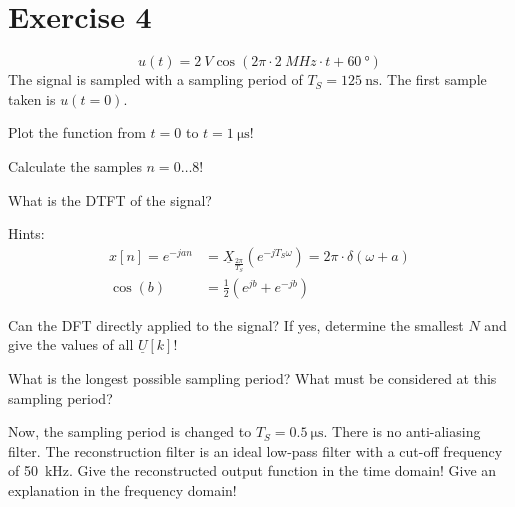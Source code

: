 %
%
%

{}
\section*{Exercise 4}

\begin{question}[subtitle={Sampling Periodic Signals}]
	\begin{equation*}
		u(t) = \SI{2}{V} \cos\left(2\pi \cdot \SI{2}{MHz} \cdot t + \SI{60}{\degree}\right)
	\end{equation*}
	The signal is sampled with a sampling period of $T_S = \SI{125}{\nano\second}$. The first sample taken is $u(t = 0)$.
	
	\begin{tasks}
		\task
		Plot the function from $t = 0$ to $t = \SI{1}{\micro\second}$!
		
		\task
		Calculate the samples $n = 0 \dots 8$!
		
		\task
		What is the DTFT of the signal?
		
		Hints:
		\begin{equation*}
			\begin{split}
				x[n] = e^{-j a n} &= \underline{X}_{\frac{2\pi}{T_S}}\left(e^{-j T_S \omega}\right) = 2 \pi \cdot \delta \left(\omega + a\right) \\
				\cos\left(b\right) &= \frac{1}{2} \left(e^{j b} + e^{-j b}\right)
			\end{split}
		\end{equation*}
		
		\task
		Can the DFT directly applied to the signal? If yes, determine the smallest $N$ and give the values of all $\underline{U}[k]$!
		
		\task
		What is the longest possible sampling period? What must be considered at this sampling period?
		
		\task
		Now, the sampling period is changed to $T_S = \SI{0.5}{\micro\second}$. There is no anti-aliasing filter. The reconstruction filter is an ideal low-pass filter with a cut-off frequency of \SI{50}{kHz}. Give the reconstructed output function in the time domain! Give an explanation in the frequency domain!
	\end{tasks}
\end{question}


